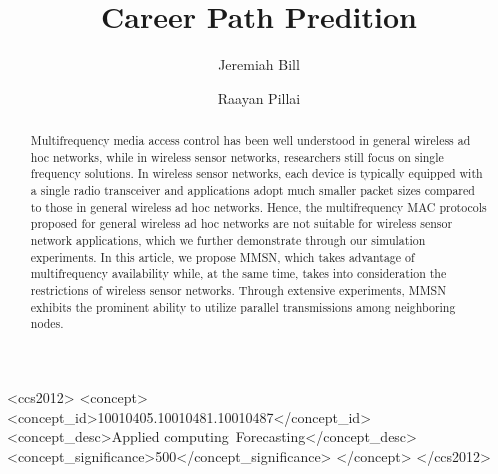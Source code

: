 \documentclass[format=acmlarge, review=false, screen=true]{acmart}
\begin{document}
\title{Career Path Predition}

\author{Jeremiah Bill}

\author{Raayan Pillai}


  
\begin{abstract}
Multifrequency media access control has been well understood in
general wireless ad hoc networks, while in wireless sensor networks,
researchers still focus on single frequency solutions. In wireless
sensor networks, each device is typically equipped with a single
radio transceiver and applications adopt much smaller packet sizes
compared to those in general wireless ad hoc networks. Hence, the
multifrequency MAC protocols proposed for general wireless ad hoc
networks are not suitable for wireless sensor network applications,
which we further demonstrate through our simulation experiments. In
this article, we propose MMSN, which takes advantage of
multifrequency availability while, at the same time, takes into
consideration the restrictions of wireless sensor networks. Through
extensive experiments, MMSN exhibits the prominent ability to utilize
parallel transmissions among neighboring nodes. 
\end{abstract}


%
%
\begin{CCSXML}
	<ccs2012>
	<concept>
	<concept_id>10010405.10010481.10010487</concept_id>
	<concept_desc>Applied computing~Forecasting</concept_desc>
	<concept_significance>500</concept_significance>
	</concept>
	</ccs2012>
\end{CCSXML}




%
%






\maketitle

\renewcommand{\shortauthors}{J. Bill et al.}


\end{document}

